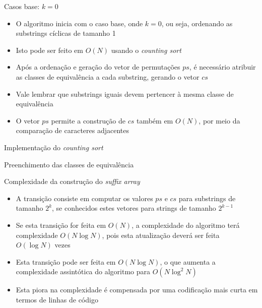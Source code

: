\begin{frame}[fragile]{Casos base: $k = 0$}

    \begin{itemize}
        \item O algoritmo inicia com o caso base, onde $k = 0$, ou seja, ordenando as substrings
            cíclicas de tamanho 1

        \item Isto pode ser feito em $O(N)$ usando o \textit{counting sort}

        \item Após a ordenação e geração do vetor de permutações $ps$, é necessário atribuir
            as classes de equivalência a cada substring, gerando o vetor $cs$

        \item Vale lembrar que substrings iguais devem pertencer à mesma classe de
            equivalência

        \item O vetor $ps$ permite a construção de $cs$ também em $O(N)$, por meio da comparação
            de caracteres adjacentes
    \end{itemize}

\end{frame}

\begin{frame}[fragile]{Implementação do {\it counting sort}}
\end{frame}

\begin{frame}[fragile]{Preenchimento das classes de equivalência}
\end{frame}

\begin{frame}[fragile]{Complexidade da construção do {\it suffix array}}

    \begin{itemize}
        \item A transição consiste em computar os valores $ps$ e $cs$ para substrings de tamanho
            $2^k$, se conhecidos estes vetores para strings de tamanho $2^{k - 1}$

        \item Se esta  transição for feita em $O(N)$, a complexidade do algoritmo terá
            complexidade $O(N\log N)$, pois esta atualização deverá ser feita $O(\log N)$ vezes

        \item Esta transição pode ser feita em $O(N\log N)$, o que aumenta a complexidade 
            assintótica do algoritmo para $O(N\log^2 N)$

        \item Esta piora na complexidade é compensada por uma codificação mais curta em termos de 
            linhas de código

    \end{itemize}

\end{frame}

